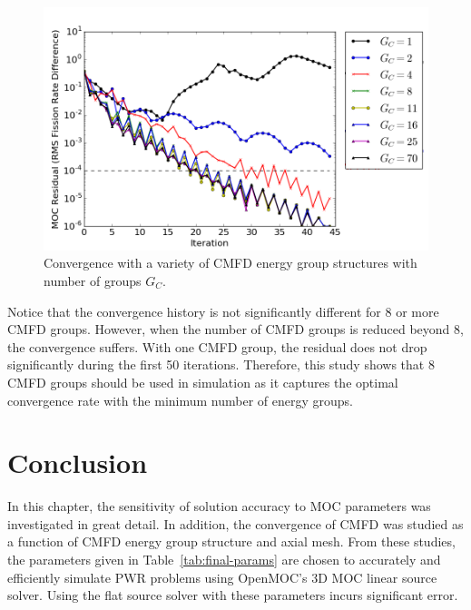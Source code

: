 \begin{figure}[h!]
	\centering
	\includegraphics[width=0.9\linewidth]{figures/results/sensitivity/cmfd-groups.png}
	\caption[]{Convergence with a variety of \ac{CMFD} energy group structures with number of groups $G_C$.}
	\label{fig:cmfd-energy-groups}
\end{figure}

Notice that the convergence history is not significantly different for 8 or more \ac{CMFD} groups. However, when the number of \ac{CMFD} groups is reduced beyond 8, the convergence suffers. With one \ac{CMFD} group, the residual does not drop significantly during the first 50 iterations. Therefore, this study shows that 8 \ac{CMFD} groups should be used in simulation as it captures the optimal convergence rate with the minimum number of energy groups.

\section{Conclusion}
\label{sec:sensitivity-conclusion}

In this chapter, the sensitivity of solution accuracy to \ac{MOC} parameters was investigated in great detail. In addition, the convergence of \ac{CMFD} was studied as a function of \ac{CMFD} energy group structure and axial mesh. From these studies, the parameters given in Table~\ref{tab:final-params} are chosen to accurately and efficiently simulate \ac{PWR} problems using OpenMOC's 3D \ac{MOC} linear source solver. Using the flat source solver with these parameters incurs significant error.

